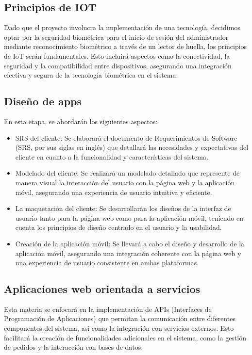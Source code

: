 \documentclass[conference]{IEEEtran}
\begin{document}
\subsection{Principios de IOT}

Dado que el proyecto involucra la implementación de una tecnología, decidimos optar por la seguridad biométrica para el inicio de sesión del administrador mediante reconocimiento biométrico a través de un lector de huella, los principios de IoT serán fundamentales. Esto incluirá aspectos como la conectividad, la seguridad y la compatibilidad entre dispositivos, asegurando una integración efectiva y segura de la tecnología biométrica en el sistema.

\subsection{Diseño de apps}

En esta etapa, se abordarán los siguientes aspectos:
\begin{itemize}
  \item SRS del cliente: Se elaborará el documento de Requerimientos de Software (SRS, por sus siglas en inglés) que detallará las necesidades y expectativas del cliente en cuanto a la funcionalidad y características del sistema.
  \item Modelado del cliente: Se realizará un modelado detallado que represente de manera visual la interacción del usuario con la página web y la aplicación móvil, asegurando una experiencia de usuario intuitiva y eficiente.
  \item La maquetación del cliente: Se desarrollarán los diseños de la interfaz de usuario tanto para la página web como para la aplicación móvil, teniendo en cuenta los principios de diseño centrado en el usuario y la usabilidad.
  \item Creación de la aplicación móvil: Se llevará a cabo el diseño y desarrollo de la aplicación móvil, asegurando una integración coherente con la página web y una experiencia de usuario consistente en ambas plataformas.
\end{itemize}

\subsection{Aplicaciones web orientada a servicios}

Esta materia se enfocará en la implementación de APIs (Interfaces de Programación de Aplicaciones) que permitan la comunicación entre diferentes componentes del sistema, así como la integración con servicios externos. Esto facilitará la creación de funcionalidades adicionales en el sistema, como la gestión de pedidos y la interacción con bases de datos.
\end{document}
